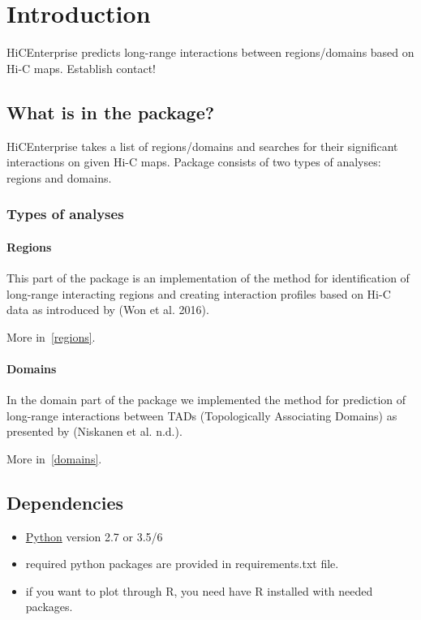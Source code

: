 \chapter{Introduction}
\label{intro}

HiCEnterprise predicts long-range interactions between regions/domains based on Hi-C maps.
Establish contact!

\section{What is in the package?}
HiCEnterprise takes a list of regions/domains and searches for their significant interactions on given Hi-C maps.
Package consists of two types of analyses: regions and domains.

\subsection{Types of analyses}

\subsubsection{Regions}
This part of the package is an implementation of the method for identification of long-range interacting regions and
creating interaction profiles based on Hi-C data as introduced by (Won et al. 2016).

More in~\ref{regions}.

\subsubsection{Domains}
In the domain part of the package we implemented the method for prediction of long-range interactions between TADs
(Topologically Associating Domains) as presented by (Niskanen et al. n.d.).

More in~\ref{domains}.

\section{Dependencies}
\begin{itemize}
\item \href{https://www.python.org}{Python} version 2.7 or 3.5/6
\item required python packages are provided in requirements.txt file.
\item if you want to plot through R, you need have R installed with needed packages.

\end{itemize}

